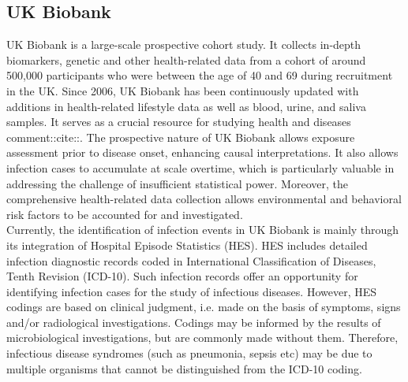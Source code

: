 \documentclass{article}
\begin{document}
\subsection{UK Biobank}
UK Biobank is a large-scale prospective cohort study. It collects in-depth biomarkers, genetic and other health-related data from a cohort of around 500,000 participants who were between the age of 40 and 69 during recruitment in the UK. Since 2006, UK Biobank has been continuously updated with additions in health-related lifestyle data as well as blood, urine, and saliva samples. It serves as a crucial resource for studying health and diseases comment::cite::. The prospective nature of UK Biobank allows exposure assessment prior to disease onset, enhancing causal interpretations. It also allows infection cases to accumulate at scale overtime, which is particularly valuable in addressing the challenge of insufficient statistical power. Moreover, the comprehensive health-related data collection allows environmental and behavioral risk factors to be accounted for and investigated.
\\
Currently, the identification of infection events in UK Biobank is mainly through its integration of Hospital Episode Statistics (HES). HES includes detailed infection diagnostic records coded in International Classification of Diseases, Tenth Revision (ICD-10). Such infection records offer an opportunity for identifying infection cases for the study of infectious diseases. However, HES codings are based on clinical judgment, i.e. made on the basis of symptoms, signs and/or radiological investigations. Codings may be informed by the results of microbiological investigations, but are commonly made without them. Therefore, infectious disease syndromes (such as pneumonia, sepsis etc) may be due to multiple organisms that cannot be distinguished from the ICD-10 coding.
\end{document}
